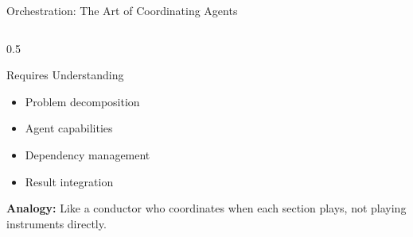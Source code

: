 \documentclass[aspectratio=169,11pt]{beamer}
\begin{document}
\begin{frame}{Orchestration: The Art of Coordinating Agents}
\begin{columns}[T]
\begin{column}{0.5\textwidth}
\begin{alertblock}{Requires Understanding}
\begin{itemize}
    \item Problem decomposition
    \item Agent capabilities
    \item Dependency management
    \item Result integration
\end{itemize}
\end{alertblock}

\vspace{0.2cm}
\textbf{Analogy:} Like a conductor who coordinates when each section plays, not playing instruments directly.
\end{column}
\end{columns}
\end{frame}
\end{document}
